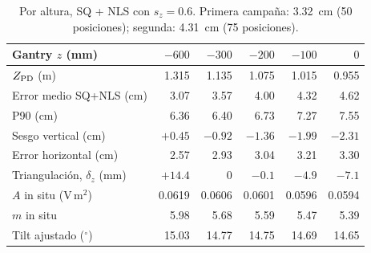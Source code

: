 \documentclass[11pt,a4paper]{article}
\begin{document}
\begin{table}[H]\centering\small
\begin{tabular}{lrrrrr}\toprule
Gantry $z$ (mm) & $-600$ & $-300$ & $-200$ & $-100$ & $0$\\\midrule
$Z_{\rm PD}$ (m) & 1.315 & 1.135 & 1.075 & 1.015 & 0.955\\
Error medio SQ+NLS (cm) & 3.07 & 3.57 & 4.00 & 4.32 & 4.62\\
P90 (cm) & 6.36 & 6.40 & 6.73 & 7.27 & 7.55\\
Sesgo vertical (cm) & $+0.45$ & $-0.92$ & $-1.36$ & $-1.99$ & $-2.31$\\
Error horizontal (cm) & 2.57 & 2.93 & 3.04 & 3.21 & 3.30\\
Triangulación, $\delta_z$ (mm) & $+14.4$ & 0 & $-0.1$ & $-4.9$ & $-7.1$\\
$A$ in situ (V\,m$^2$) & 0.0619 & 0.0606 & 0.0601 & 0.0596 & 0.0594\\
$m$ in situ & 5.98 & 5.68 & 5.59 & 5.47 & 5.39\\
Tilt ajustado ($^\circ$) & 15.03 & 14.77 & 14.75 & 14.69 & 14.65\\\bottomrule
\end{tabular}
\caption{Por altura, SQ + NLS con $s_z=0.6$. Primera campaña: 3.32~cm (50 posiciones); segunda: 4.31~cm (75 posiciones).}
\end{table}
\end{document}

